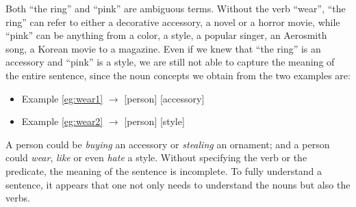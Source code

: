 %
Both ``the ring'' and ``pink'' are ambiguous terms.
Without the verb ``wear'', ``the ring'' can refer to either
a decorative accessory, a novel or a horror movie,
while ``pink'' can be anything from
a color, a style, a popular singer, an Aerosmith song,
a Korean movie to a magazine.
%
%
Even if we knew that ``the ring'' is an accessory and
``pink'' is a style, we are still not able to capture the meaning
of the entire sentence, since the noun concepts we obtain from the
two examples are:
\begin{itemize}
\item Example \ref{eg:wear1} $\longrightarrow$ [person] [accessory]
\item Example \ref{eg:wear2} $\longrightarrow$ [person] [style]
\end{itemize}
A person could be {\em buying} an accessory or {\em stealing}
an ornament; and a person could {\em wear}, {\em like} or
even {\em hate} a style. Without specifying the verb
or the predicate, the meaning of the sentence is incomplete.
To fully understand a sentence,
it appears that one not only needs to understand the nouns but also the verbs.

